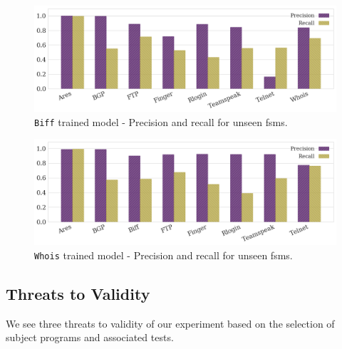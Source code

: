 \begin{figure}[ht!]
\centering
\includegraphics[scale=0.25]{6_5_biff_cross.png}
\vspace{-10pt}
\caption{\texttt{Biff} trained model - Precision and recall for unseen fsms.}
\vspace{-10pt}
\label{biff_cross}
\end{figure}

\begin{figure}[ht!]
\centering
\includegraphics[scale=0.25]{6_6_whois_cross.png}
\vspace{-10pt}
\caption{\texttt{Whois} trained model - Precision and recall for unseen fsms.}
\vspace{-15pt}
\label{whois_cross}
\end{figure}
\fi
\subsection{Threats to Validity}
\label{sec:threats}
We see three threats to validity of our
experiment based on the selection of subject programs and associated tests. 

